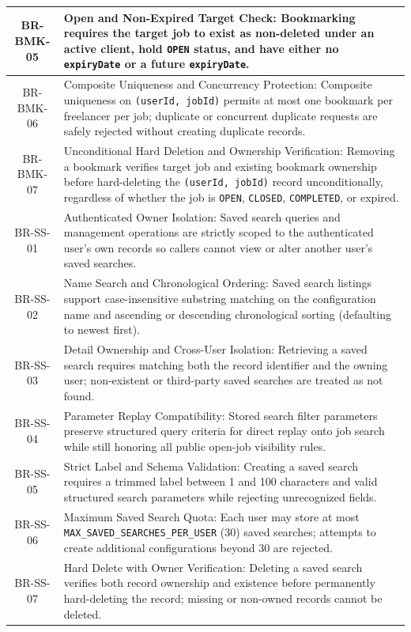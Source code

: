 \begin{longtable}{|c|p{12cm}|}
    BR-BMK-05 & Open and Non-Expired Target Check: Bookmarking requires the target job to exist as non-deleted under an active client, hold \texttt{OPEN} status, and have either no \texttt{expiryDate} or a future \texttt{expiryDate}. \\ \hline
    BR-BMK-06 & Composite Uniqueness and Concurrency Protection: Composite uniqueness on \texttt{(userId, jobId)} permits at most one bookmark per freelancer per job; duplicate or concurrent duplicate requests are safely rejected without creating duplicate records. \\ \hline
    BR-BMK-07 & Unconditional Hard Deletion and Ownership Verification: Removing a bookmark verifies target job and existing bookmark ownership before hard-deleting the \texttt{(userId, jobId)} record unconditionally, regardless of whether the job is \texttt{OPEN}, \texttt{CLOSED}, \texttt{COMPLETED}, or expired. \\ \hline
    BR-SS-01 & Authenticated Owner Isolation: Saved search queries and management operations are strictly scoped to the authenticated user's own records so callers cannot view or alter another user's saved searches. \\ \hline
    BR-SS-02 & Name Search and Chronological Ordering: Saved search listings support case-insensitive substring matching on the configuration name and ascending or descending chronological sorting (defaulting to newest first). \\ \hline
    BR-SS-03 & Detail Ownership and Cross-User Isolation: Retrieving a saved search requires matching both the record identifier and the owning user; non-existent or third-party saved searches are treated as not found. \\ \hline
    BR-SS-04 & Parameter Replay Compatibility: Stored search filter parameters preserve structured query criteria for direct replay onto job search while still honoring all public open-job visibility rules. \\ \hline
    BR-SS-05 & Strict Label and Schema Validation: Creating a saved search requires a trimmed label between 1 and 100 characters and valid structured search parameters while rejecting unrecognized fields. \\ \hline
    BR-SS-06 & Maximum Saved Search Quota: Each user may store at most \texttt{MAX\_SAVED\_SEARCHES\_PER\_USER} (30) saved searches; attempts to create additional configurations beyond 30 are rejected. \\ \hline
    BR-SS-07 & Hard Delete with Owner Verification: Deleting a saved search verifies both record ownership and existence before permanently hard-deleting the record; missing or non-owned records cannot be deleted. \\ \hline

\end{longtable}

